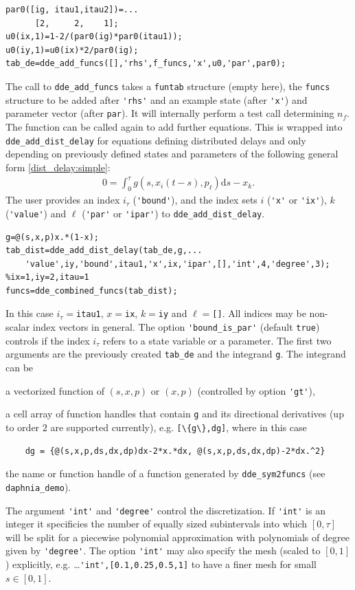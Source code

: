 \documentclass[10pt]{scrartcl}
\renewcommand{\d}{\mathrm{d}}
\newcommand{\blist}[1]{\mbox{\lstinline!#1!}}
\begin{document}
\begin{lstlisting}
par0([ig, itau1,itau2])=...
      [2,     2,    1];
u0(ix,1)=1-2/(par0(ig)*par0(itau1));
u0(iy,1)=u0(ix)*2/par0(ig);
tab_de=dde_add_funcs([],'rhs',f_funcs,'x',u0,'par',par0);  
\end{lstlisting}
The call to \blist{dde_add_funcs} takes a \blist{funtab} structure
(empty here), the \blist{funcs} structure to be added after
\blist{'rhs'} and an example state (after \blist{'x'}) and parameter
vector (after \blist{par}). It will internally perform a test call
determining $n_f$. The function can be called again to add further equations. This is wrapped into \blist{dde_add_dist_delay} for equations defining distributed delays and only depending on previously defined states and parameters of the following general form \eqref{dist_delay:simple}:
\begin{align}
  \label{dist_delay:rep}
  0=\int_0^\tau g(s,x_i(t-s),p_\ell)\d s-x_k.
\end{align}
The user provides an index $i_\tau$ (\blist{'bound'}), and the index
sets $i$ (\blist{'x'} or \blist{'ix'}), $k$ (\blist{'value'}) and $\ell$ (\blist{'par'} or \blist{'ipar'}) to \blist{dde_add_dist_delay}.
\begin{lstlisting}
g=@(s,x,p)x.*(1-x);
tab_dist=dde_add_dist_delay(tab_de,g,...
    'value',iy,'bound',itau1,'x',ix,'ipar',[],'int',4,'degree',3); %ix=1,iy=2,itau=1
funcs=dde_combined_funcs(tab_dist);  
\end{lstlisting}
In this case $i_\tau=$\blist{itau1}, $x=$\blist{ix}, $k=$\blist{iy}
and $\ell=$\blist{[]}. All indices may be non-scalar index vectors in
general. The option \blist{'bound_is_par'} (default \blist{true})
controls if the index $i_\tau$ refers to a state variable or a
parameter.  The first two arguments are the previously created
\blist{tab_de} and the integrand \blist{g}. The integrand can be
\begin{compactitem}
\item a vectorized function of $(s,x,p)$ or $(x,p)$ (controlled by option \blist{'gt'}),
\item a cell array of function handles that contain \blist{g} and its
  directional derivatives (up to order $2$ are supported currently),
  e.g. \blist{[\{g\},dg]}, where in this case
  \begin{lstlisting}
    dg = {@(s,x,p,ds,dx,dp)dx-2*x.*dx, @(s,x,p,ds,dx,dp)-2*dx.^2}
  \end{lstlisting}
\item the name or function handle of a function generated by
  \blist{dde_sym2funcs} (see \texttt{daphnia\_demo}).
\end{compactitem}
The argument \blist{'int'} and \blist{'degree'} control the
discretization. If \blist{'int'} is an integer it specificies the
number of equally sized subintervals into which $[0,\tau]$ will be
split for a piecewise polynomial approximation with polynomials of
degree given by \blist{'degree'}. The option \blist{'int'} may also
specify the mesh (scaled to $[0,1]$) explicitly,
e.g. \ldots\blist{'int',[0.1,0.25,0.5,1]} to have a finer mesh for
small $s\in[0,1]$.
\end{document}
